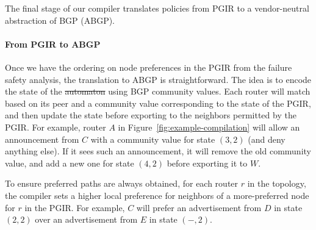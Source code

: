 \documentclass{sig-alternate-10pt}
\newcommand{\para}[1]{\paragraph*{\textbf{#1}}}
\newcommand{\KW}[1]{\texttt{\small\bfseries{#1}}}
\providecommand{\DIFadd}[1]{{\protect\color{blue}\uwave{#1}}} %
\providecommand{\DIFdel}[1]{{\protect\color{red}\sout{#1}}}                      %
\providecommand{\DIFaddbegin}{} %
\providecommand{\DIFaddend}{} %
\providecommand{\DIFdelbegin}{} %
\providecommand{\DIFdelend}{} %
\begin{document}
\newcommand{\highlight}[1]{%
  \colorbox{red!50}{$\displaystyle#1$}}
\newcommand{\Router}[1]{\KW{Router} #1:}
\newcommand{\REGEX}[1]{\texttt{regex}(#1)}
\newcommand{\PEER}{\texttt{peer}}
\newcommand{\COMM}{\texttt{comm}}
\newcommand{\MED}{\texttt{MED}}
\newcommand{\Arrow}{\ensuremath{\leftarrow}}




The final stage of our compiler translates policies from PGIR to a vendor-neutral abstraction of BGP (ABGP).

\para{From PGIR to ABGP}

Once we have the ordering on node preferences in the PGIR from the failure safety analysis, the translation to ABGP is straightforward. The idea is to encode the state of the \DIFdelbegin \DIFdel{automaton }\DIFdelend \DIFaddbegin \DIFadd{automata }\DIFaddend using BGP community values. Each router will match based on its peer and a community value corresponding to the state of the PGIR, and then update the state before exporting to the neighbors permitted by the PGIR. For example, router $A$ in Figure~\ref{fig:example-compilation} will allow an announcement from $C$ with a community value for state $(3,2)$ (and deny anything else). If it sees such an announcement, it will remove the old community value, and add a new one for state $(4,2)$ before exporting it to $W$.

To ensure preferred paths are always obtained, for each router $r$ in the topology, the compiler sets a higher local preference for neighbors of a more-preferred node for $r$ in the PGIR. For example, $C$ will prefer an advertisement from $D$ in state $(2,2)$ over an advertisement from $E$ in state $(-,2)$.
\end{document}
